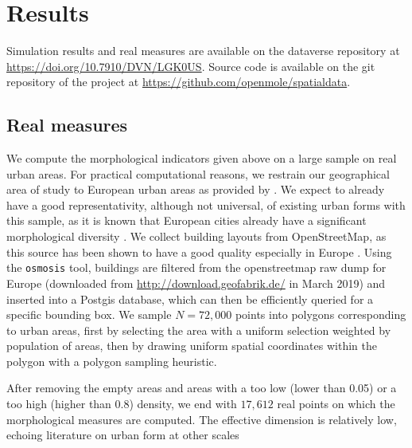 \documentclass[letterpaper]{article}
\begin{document}
\section{Results} \label{sec:results}

Simulation results and real measures are available on the dataverse repository at \url{https://doi.org/10.7910/DVN/LGK0US}. Source code is available on the git repository of the project at \url{https://github.com/openmole/spatialdata}.


\subsection{Real measures}

We compute the morphological indicators given above on a large sample on real urban areas. For practical computational reasons, we restrain our geographical area of study to European urban areas as provided by \cite{}. We expect to already have a good representativity, although not universal, of existing urban forms with this sample, as it is known that European cities already have a significant morphological diversity \citep{le2015forme}. We collect building layouts from OpenStreetMap, as this source has been shown to have a good quality especially in Europe \citep{mooney2010towards}. Using the \texttt{osmosis} tool, buildings are filtered from the openstreetmap raw dump for Europe (downloaded from \url{http://download.geofabrik.de/} in March 2019) and inserted into a Postgis database, which can then be efficiently queried for a specific bounding box.
We sample $N=72,000$ points into polygons corresponding to urban areas, first by selecting the area with a uniform selection weighted by population of areas, then by drawing uniform spatial coordinates within the polygon with a polygon sampling heuristic. %


After removing the empty areas and areas with a too low (lower than 0.05) or a too high (higher than 0.8) density, we end with $17,612$ real points on which the morphological measures are computed. The effective dimension is relatively low, echoing literature on urban form at other scales  
\end{document}
